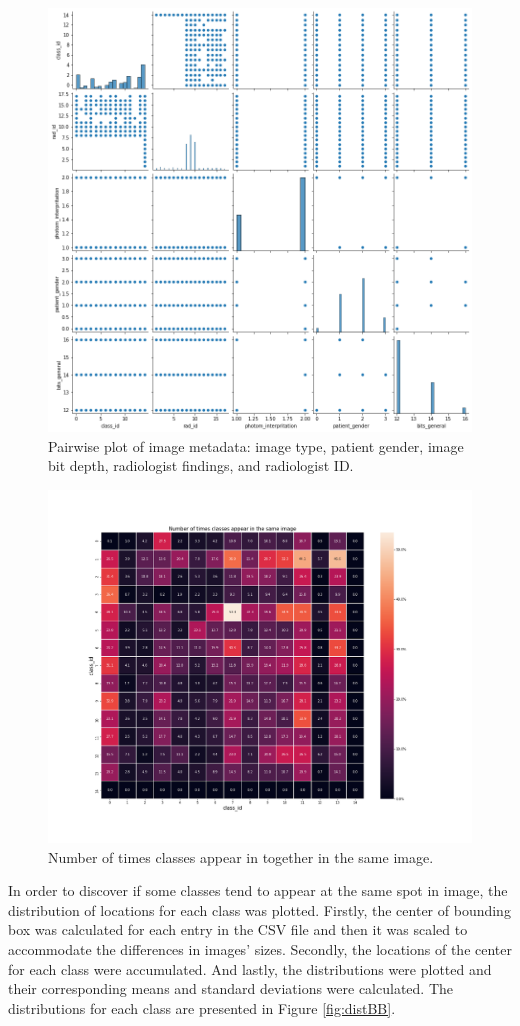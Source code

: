 \documentclass[conference]{IEEEtran}
\begin{document}
\begin{figure}[h]
	\centering
    \includegraphics[width=0.80\linewidth]{pairplot}
    \caption{Pairwise plot of image metadata: image type, patient gender, image bit depth, radiologist findings, and radiologist ID.}
	\label{fig:pairplot}
\end{figure}

\begin{figure}[h]
	\centering
    \includegraphics[width=0.80\linewidth]{NumClassAppearSameImg}
    \caption{Number of times classes appear in together in the same image.}
	\label{fig:NumTimesClassesAppearSameImg}
\end{figure}

In order to discover if some classes tend to appear at the same spot in image, the distribution of locations for each class was plotted. Firstly, the center of bounding box was calculated for each entry in the CSV file and then it was scaled to accommodate the differences in images’ sizes. Secondly, the locations of the center for each class were accumulated. And lastly, the distributions were plotted and their corresponding means and standard deviations were calculated. The distributions for each class are presented in Figure \ref{fig:distBB}.
\end{document}
